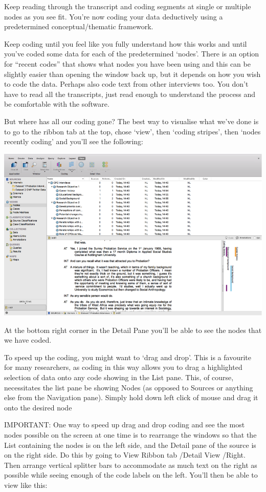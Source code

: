 \documentclass[]{book}
\theoremstyle{definition}
\theoremstyle{definition}
\theoremstyle{definition}
\theoremstyle{remark}
\begin{document}
Keep reading through the transcript and coding segments at single or
multiple nodes as you see fit. You're now coding your data deductively
using a predetermined conceptual/thematic framework.

Keep coding until you feel like you fully understand how this works and
until you've coded some data for each of the predetermined `nodes'.
There is an option for ``recent codes'' that shows what nodes you have
been using and this can be slightly easier than opening the window back
up, but it depends on how you wish to code the data. Perhaps also code
text from other interviews too. You don't have to read all the
transcripts, just read enough to understand the process and be
comfortable with the software.

But where has all our coding gone? The best way to visualise what we've
done is to go to the ribbon tab at the top, chose `view', then `coding
stripes', then `nodes recently coding' and you'll see the following:

\includegraphics{imgs/qual_46.png}

At the bottom right corner in the Detail Pane you'll be able to see the
nodes that we have coded.

To speed up the coding, you might want to `drag and drop'. This is a
favourite for many researchers, as coding in this way allows you to drag
a highlighted selection of data onto any code showing in the List pane.
This, of course, necessitates the list pane be showing Nodes (as opposed
to Sources or anything else from the Navigation pane). Simply hold down
left click of mouse and drag it onto the desired node

IMPORTANT: One way to speed up drag and drop coding and see the most
nodes possible on the screen at one time is to rearrange the windows so
that the List containing the nodes is on the left side, and the Detail
pane of the source is on the right side. Do this by going to View Ribbon
tab /Detail View /Right. Then arrange vertical splitter bars to
accommodate as much text on the right as possible while seeing enough of
the code labels on the left. You'll then be able to view like this:
\end{document}
